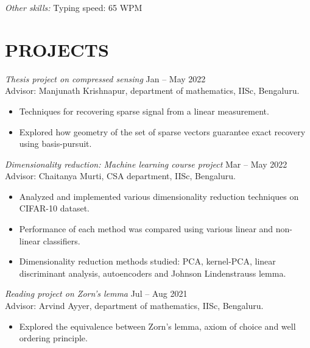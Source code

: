 \documentclass[margin, 10pt]{res} %
\begin{document}
\begin{resume}
{\sl Other skills:} Typing speed: 65 WPM
 
 
\section{PROJECTS}

{\sl Thesis project on compressed sensing} \hfill  Jan -- May 2022\\
Advisor: Manjunath Krishnapur, department of mathematics, IISc, Bengaluru.
\begin{itemize} \itemsep -2pt
	\item Techniques for recovering sparse signal from a linear measurement.
	\item Explored how geometry of the set of sparse vectors
		guarantee exact recovery using basis-pursuit.
\end{itemize} 

\smallskip

{\sl Dimensionality reduction: Machine learning course project} \hfill Mar -- May 2022\\
	Advisor: Chaitanya Murti, CSA department, IISc, Bengaluru.
	\begin{itemize}
		\item Analyzed and implemented various dimensionality
			reduction techniques on CIFAR-10 dataset.
		\item Performance of each method was compared using various
			linear and non-linear classifiers.
		\item Dimensionality reduction methods studied: PCA,
			kernel-PCA, linear discriminant analysis, autoencoders
			and Johnson Lindenstrauss lemma.
	\end{itemize}

\smallskip

{\sl Reading project on Zorn's lemma} \hfill Jul -- Aug 2021 \\
Advisor: Arvind Ayyer, department of mathematics, IISc, Bengaluru.
\begin{itemize} 
	\item Explored the equivalence between Zorn's lemma,
		axiom of choice and well ordering principle.
\end{itemize} 

\smallskip


\end{resume}
\end{document}
